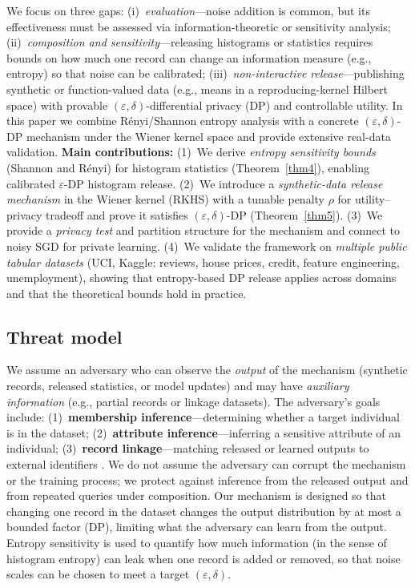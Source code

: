 \documentclass[journal,transmag]{IEEEtran}
\begin{document}
We focus on three gaps: (i)~\emph{evaluation}---noise addition is common, but its effectiveness must be assessed via information-theoretic or sensitivity analysis; (ii)~\emph{composition and sensitivity}---releasing histograms or statistics requires bounds on how much one record can change an information measure (e.g., entropy) so that noise can be calibrated; (iii)~\emph{non-interactive release}---publishing synthetic or function-valued data (e.g., means in a reproducing-kernel Hilbert space) with provable $(\varepsilon,\delta)$-differential privacy (DP) and controllable utility. In this paper we combine R\'enyi/Shannon entropy analysis with a concrete $(\varepsilon,\delta)$-DP mechanism under the Wiener kernel space and provide extensive real-data validation. \textbf{Main contributions:} (1)~We derive \emph{entropy sensitivity bounds} (Shannon and R\'enyi) for histogram statistics (Theorem~\ref{thm4}), enabling calibrated $\varepsilon$-DP histogram release. (2)~We introduce a \emph{synthetic-data release mechanism} in the Wiener kernel (RKHS) with a tunable penalty $\rho$ for utility--privacy tradeoff and prove it satisfies $(\varepsilon,\delta)$-DP (Theorem~\ref{thm5}). (3)~We provide a \emph{privacy test} and partition structure for the mechanism and connect to noisy SGD for private learning. (4)~We validate the framework on \emph{multiple public tabular datasets} (UCI, Kaggle: reviews, house prices, credit, feature engineering, unemployment), showing that entropy-based DP release applies across domains and that the theoretical bounds hold in practice.

\subsection{Threat model}
We assume an adversary who can observe the \emph{output} of the mechanism (synthetic records, released statistics, or model updates) and may have \emph{auxiliary information} (e.g., partial records or linkage datasets). The adversary's goals include: (1)~\textbf{membership inference}---determining whether a target individual is in the dataset; (2)~\textbf{attribute inference}---inferring a sensitive attribute of an individual; (3)~\textbf{record linkage}---matching released or learned outputs to external identifiers \cite{koudas2006record}. We do not assume the adversary can corrupt the mechanism or the training process; we protect against inference from the released output and from repeated queries under composition. Our mechanism is designed so that changing one record in the dataset changes the output distribution by at most a bounded factor (DP), limiting what the adversary can learn from the output. Entropy sensitivity is used to quantify how much information (in the sense of histogram entropy) can leak when one record is added or removed, so that noise scales can be chosen to meet a target $(\varepsilon,\delta)$.
\end{document}
